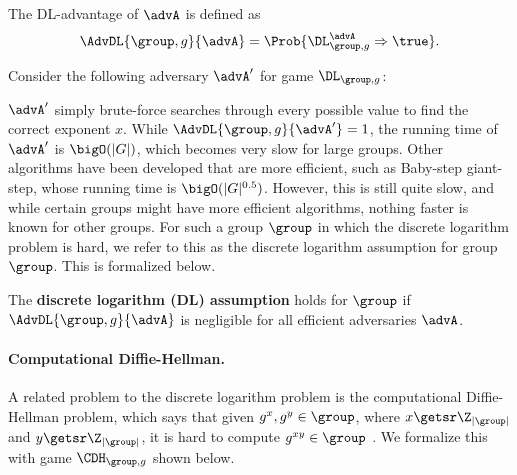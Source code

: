 The DL-advantage of $\advA$ is defined as 
\begin{equation*}
\AdvDL{\group, g}{\advA} = \Prob{\DL^\advA_{\group, g}\Rightarrow\true}.
\end{equation*}

Consider the following adversary $\advA'$ for game $\DL_{\group, g}$:

\begin{center}
\end{center}

$\advA'$ simply brute-force searches through every possible value to find the correct exponent $x$. While $\AdvDL{\group, g}{\advA'}=1$, the running time of $\advA'$ is $\bigO(|G|)$, which becomes very slow for large groups. Other algorithms have been developed that are more efficient, such as Baby-step giant-step, whose running time is $\bigO(|G|^{0.5})$. However, this is still quite slow, and while certain groups might have more efficient algorithms, nothing faster is known for other groups. For such a group $\group$ in which the discrete logarithm problem is hard, we refer to this as the discrete logarithm assumption for group $\group$. This is formalized below.

\begin{definition}
	The \textbf{discrete logarithm (DL) assumption} holds for $\group$ if $\AdvDL{\group, g}{\advA}$ is negligible for all efficient adversaries $\advA$.
\end{definition}

\paragraph{Computational Diffie-Hellman.} A related problem to the discrete logarithm problem is the computational Diffie-Hellman problem, which says that given $g^x, g^y \in \group$, where $x \getsr \Z_{|\group|}$ and $y \getsr \Z_{|\group|}$, it is hard to compute $g^{xy} \in \group$ \cite{BonehShoupBook}. We formalize this with game $\CDH_{\group, g}$ shown below.  

\begin{center}
\end{center}

